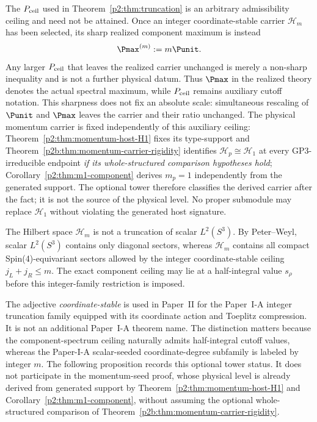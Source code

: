 \documentclass[11pt,a4paper]{article}
\begin{document}
\begin{remark}
\label{p2:rem:pmax-selected-carrier-reading}
The \(P_{\rm ceil}\) used in Theorem~\ref{p2:thm:truncation} is an arbitrary
admissibility ceiling and need not be attained.  Once an integer
coordinate-stable carrier \(\mathcal H_m\) has been selected, its sharp
realized component maximum is instead
\[
\Pmax^{(m)}:=m\Punit.
\]
Any larger \(P_{\rm ceil}\) that leaves the realized carrier unchanged is
merely a non-sharp inequality and is not a further physical datum.  Thus
\(\Pmax\) in the realized theory denotes the actual spectral maximum, while
\(P_{\rm ceil}\) remains auxiliary cutoff notation.  This sharpness does not
fix an absolute scale: simultaneous rescaling of \(\Punit\) and \(\Pmax\)
leaves the carrier and their ratio unchanged.
The physical momentum carrier is fixed independently of this auxiliary ceiling:
Theorem~\ref{p2:thm:momentum-host-H1} fixes its type-support and
Theorem~\ref{p2b:thm:momentum-carrier-rigidity} identifies
\(\mathcal H_p\cong\mathcal H_1\) at every GP3-irreducible
endpoint \emph{if its whole-structured comparison hypotheses hold};
Corollary~\ref{p2:thm:m1-component} derives \(m_p=1\)
independently from the generated support.  The optional tower
therefore classifies the derived carrier after the fact; it is not the source
of the physical level.  No proper submodule may replace \(\mathcal H_1\)
without violating the generated host signature.
\end{remark}

\begin{remark}
\label{p2:rem:extended-hilbert}
The Hilbert space $\mathcal H_m$ is not a truncation of scalar $L^2(S^3)$. By Peter--Weyl, scalar $L^2(S^3)$ contains only diagonal sectors, whereas $\mathcal H_m$ contains all compact Spin(4)-equivariant sectors allowed by the integer coordinate-stable ceiling $j_L+j_R\le m$.  The exact component ceiling may lie at a half-integral value $s_\rho$ before this integer-family restriction is imposed.
\end{remark}

\begin{remark}
\label{p2:rem:coordinate-stable-terminology}
The adjective \emph{coordinate-stable} is used in Paper~II for the Paper~I-A
integer truncation family equipped with its coordinate action and Toeplitz
compression.  It is not an additional Paper~I-A theorem name.  The distinction
matters because the component-spectrum ceiling naturally admits half-integral
cutoff values, whereas the Paper-I-A scalar-seeded coordinate-degree subfamily
is labeled by integer \(m\).  The following proposition records this optional tower status.  It does not
participate in the momentum-seed proof, whose physical level is already derived from generated support by
Theorem~\ref{p2:thm:momentum-host-H1} and
Corollary~\ref{p2:thm:m1-component}, without assuming the optional
whole-structured comparison of
Theorem~\ref{p2b:thm:momentum-carrier-rigidity}.
\end{remark}
\end{document}
